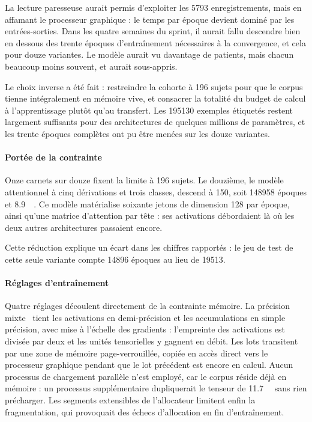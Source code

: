 La lecture paresseuse aurait permis d'exploiter les \num{5793} enregistrements, mais en
affamant le processeur graphique : le temps par époque devient dominé par les
entrées-sorties. Dans les quatre semaines du sprint, il aurait fallu descendre bien en
dessous des trente époques d'entraînement nécessaires à la convergence, et cela pour
douze variantes. Le modèle aurait vu davantage de patients, mais chacun beaucoup moins
souvent, et aurait sous-appris.

Le choix inverse a été fait : restreindre la cohorte à 196 sujets pour que le
corpus tienne intégralement en mémoire vive, et consacrer la totalité du budget de
calcul à l'apprentissage plutôt qu'au transfert. Les \num{195130} exemples étiquetés
restent largement suffisants pour des architectures de quelques millions de paramètres,
et les trente époques complètes ont pu être menées sur les douze variantes.

\paragraph{Portée de la contrainte}

Onze carnets sur douze fixent la limite à 196 sujets. Le douzième, le modèle
attentionnel à cinq dérivations et trois classes, descend à 150, soit
\num{148958} époques et \SI{8,9}{\giga\octet}. Ce modèle matérialise soixante jetons de
dimension 128 par époque, ainsi qu'une matrice d'attention par tête : ses activations
débordaient là où les deux autres architectures passaient encore.

Cette réduction explique un écart dans les chiffres rapportés : le jeu de test de cette
seule variante compte \num{14896} époques au lieu de \num{19513}.

\paragraph{Réglages d'entraînement}

Quatre réglages découlent directement de la contrainte mémoire. La précision
mixte~\cite{micikevicius2018} tient
les activations en demi-précision et les accumulations en simple précision, avec mise à
l'échelle des gradients : l'empreinte des activations est divisée par deux et les unités
tensorielles y gagnent en débit. Les lots transitent par une zone de mémoire
page-verrouillée, copiée en accès direct vers le processeur graphique pendant que le lot
précédent est encore en calcul. Aucun processus de chargement parallèle n'est employé,
car le corpus réside déjà en mémoire : un processus supplémentaire dupliquerait le
tenseur de \SI{11,7}{\giga\octet} sans rien précharger. Les segments extensibles de
l'allocateur limitent enfin la fragmentation, qui provoquait des échecs d'allocation en
fin d'entraînement.

